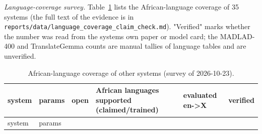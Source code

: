 \emph{Language-coverage survey.} Table~\ref{tab:t_coverage_claim} lists the African-language coverage of 35 systems (the full text of the evidence is in \texttt{reports/data/language\_coverage\_claim\_check.md}). "Verified" marks whether the number was read from the system\textquotesingle s own paper or model card; the MADLAD-400 and TranslateGemma counts are manual tallies of language tables and are unverified.

{\footnotesize\setlength{\tabcolsep}{3pt}
\begin{longtable}[]{@{}
  >{\raggedright\arraybackslash}p{}
  >{\raggedright\arraybackslash}p{}
  >{\raggedright\arraybackslash}p{}
  >{\raggedright\arraybackslash}p{}
  >{\raggedright\arraybackslash}p{}
  >{\raggedright\arraybackslash}p{}@{}}
\caption{African-language coverage of other systems (survey of 2026-10-23).}\label{tab:t_coverage_claim}\tabularnewline
\toprule\noalign{}
\begin{minipage}[b]{\linewidth}\raggedright
system
\end{minipage} & \begin{minipage}[b]{\linewidth}\raggedright
params
\end{minipage} & \begin{minipage}[b]{\linewidth}\raggedright
open
\end{minipage} & \begin{minipage}[b]{\linewidth}\raggedright
African languages supported (claimed/trained)
\end{minipage} & \begin{minipage}[b]{\linewidth}\raggedright
evaluated en-\textgreater X
\end{minipage} & \begin{minipage}[b]{\linewidth}\raggedright
verified
\end{minipage} \\
\midrule\noalign{}
\endfirsthead
\toprule\noalign{}
\begin{minipage}[b]{\linewidth}\raggedright
system
\end{minipage} & \begin{minipage}[b]{\linewidth}\raggedright
params
\end{minipage} & \begin{minipage}[b]{\linewidth}\raggedright

\end{minipage}
\end{longtable}}
